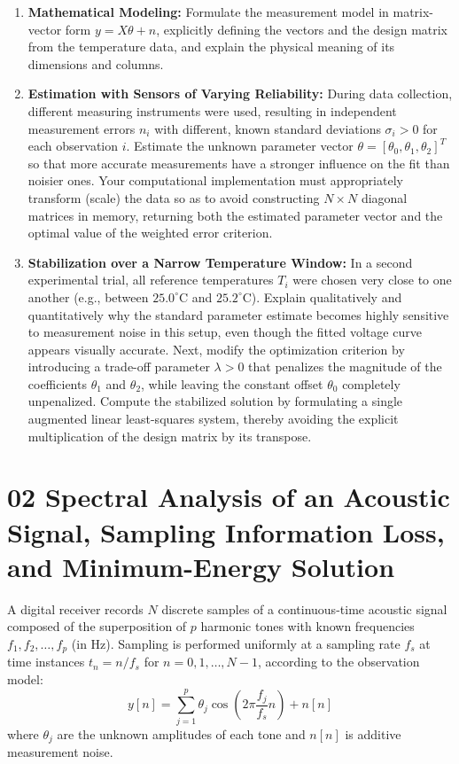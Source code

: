 \documentclass[12pt, letterpaper]{article}
\begin{document}
\begin{enumerate}
    \item \textbf{Mathematical Modeling:} Formulate the measurement model in matrix-vector form $y = X\theta + n$, explicitly defining the vectors and the design matrix from the temperature data, and explain the physical meaning of its dimensions and columns.   
    \item \textbf{Estimation with Sensors of Varying Reliability:} During data collection, different measuring instruments were used, resulting in independent measurement errors $n_i$ with different, known standard deviations $\sigma_i > 0$ for each observation $i$. Estimate the unknown parameter vector $\theta = [\theta_0, \theta_1, \theta_2]^T$ so that more accurate measurements have a stronger influence on the fit than noisier ones. Your computational implementation must appropriately transform (scale) the data so as to avoid constructing $N \times N$ diagonal matrices in memory, returning both the estimated parameter vector and the optimal value of the weighted error criterion.   
    \item \textbf{Stabilization over a Narrow Temperature Window:} In a second experimental trial, all reference temperatures $T_i$ were chosen very close to one another (e.g., between $25.0^\circ\text{C}$ and $25.2^\circ\text{C}$). Explain qualitatively and quantitatively why the standard parameter estimate becomes highly sensitive to measurement noise in this setup, even though the fitted voltage curve appears visually accurate. Next, modify the optimization criterion by introducing a trade-off parameter $\lambda > 0$ that penalizes the magnitude of the coefficients $\theta_1$ and $\theta_2$, while leaving the constant offset $\theta_0$ completely unpenalized. Compute the stabilized solution by formulating a single augmented linear least-squares system, thereby avoiding the explicit multiplication of the design matrix by its transpose.   
\end{enumerate}

\vspace{1cm}

\section*{02 Spectral Analysis of an Acoustic Signal, Sampling Information Loss, and Minimum-Energy Solution}

A digital receiver records $N$ discrete samples of a continuous-time acoustic signal composed of the superposition of $p$ harmonic tones with known frequencies $f_1, f_2, \dots, f_p$ (in Hz). Sampling is performed uniformly at a sampling rate $f_s$ at time instances $t_n = n / f_s$ for $n = 0, 1, \dots, N-1$, according to the observation model:   
\begin{equation}
    y[n] = \sum_{j=1}^{p} \theta_j \cos\left(2\pi \frac{f_j}{f_s} n\right) + n[n]
\end{equation}
where $\theta_j$ are the unknown amplitudes of each tone and $n[n]$ is additive measurement noise.   
\end{document}
